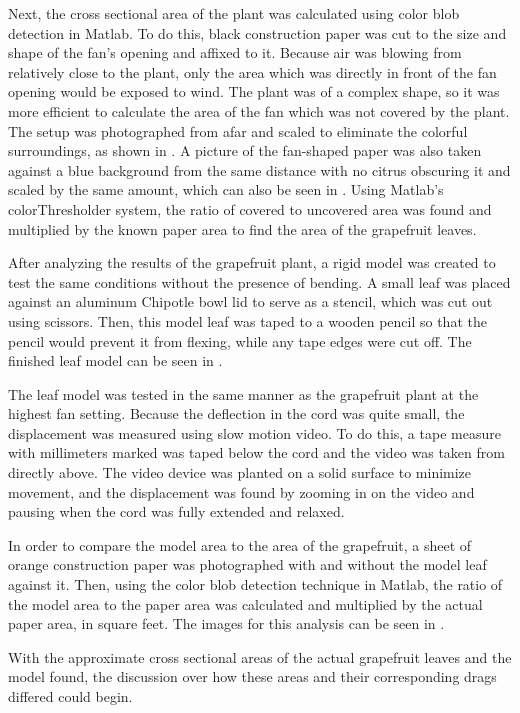 Next, the cross sectional area of the plant was calculated using color blob detection in Matlab. To do this, black construction paper was cut to the size and shape of the fan's opening and affixed to it. Because air was blowing from relatively close to the plant, only the area which was directly in front of the fan opening would be exposed to wind. The plant was of a complex shape, so it was more efficient to calculate the area of the fan which was not covered by the plant. The setup was photographed from afar and scaled to eliminate the colorful surroundings, as shown in . A picture of the fan-shaped paper was also taken against a blue background from the same distance with no citrus obscuring it and scaled by the same amount, which can also be seen in . Using Matlab's colorThresholder system, the ratio of covered to uncovered area was found and multiplied by the known paper area to find the area of the grapefruit leaves.

After analyzing the results of the grapefruit plant, a rigid model was created to test the same conditions without the presence of bending. A small leaf was placed against an aluminum Chipotle bowl lid to serve as a stencil, which was cut out using scissors. Then, this model leaf was taped to a wooden pencil so that the pencil would prevent it from flexing, while any tape edges were cut off. The finished leaf model can be seen in 
.

The leaf model was tested in the same manner as the grapefruit plant at the highest fan setting. Because the deflection in the cord was quite small, the displacement was measured using slow motion video. To do this, a tape measure with millimeters marked was taped below the cord and the video was taken from directly above. The video device was planted on a solid surface to minimize movement, and the displacement was found by zooming in on the video and pausing when the cord was fully extended and relaxed. 

In order to compare the model area to the area of the grapefruit, a sheet of orange construction paper was photographed with and without the model leaf against it. Then, using the color blob detection technique in Matlab, the ratio of the model area to the paper area was calculated and multiplied by the actual paper area, in square feet. The images for this analysis can be seen in .

With the approximate cross sectional areas of the actual grapefruit leaves and the model found, the discussion over how these areas and their corresponding drags differed could begin.


